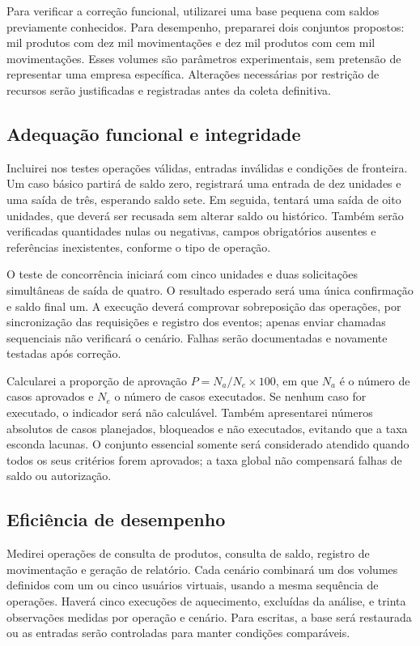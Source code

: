 Para verificar a correção funcional, utilizarei uma base pequena com saldos previamente conhecidos. Para desempenho, prepararei dois conjuntos propostos: mil produtos com dez mil movimentações e dez mil produtos com cem mil movimentações. Esses volumes são parâmetros experimentais, sem pretensão de representar uma empresa específica. Alterações necessárias por restrição de recursos serão justificadas e registradas antes da coleta definitiva.

\subsection{Adequação funcional e integridade}

Incluirei nos testes operações válidas, entradas inválidas e condições de fronteira. Um caso básico partirá de saldo zero, registrará uma entrada de dez unidades e uma saída de três, esperando saldo sete. Em seguida, tentará uma saída de oito unidades, que deverá ser recusada sem alterar saldo ou histórico. Também serão verificadas quantidades nulas ou negativas, campos obrigatórios ausentes e referências inexistentes, conforme o tipo de operação.

O teste de concorrência iniciará com cinco unidades e duas solicitações simultâneas de saída de quatro. O resultado esperado será uma única confirmação e saldo final um. A execução deverá comprovar sobreposição das operações, por sincronização das requisições e registro dos eventos; apenas enviar chamadas sequenciais não verificará o cenário. Falhas serão documentadas e novamente testadas após correção.

Calcularei a proporção de aprovação $P = N_a/N_e \times 100$, em que $N_a$ é o número de casos aprovados e $N_e$ o número de casos executados. Se nenhum caso for executado, o indicador será não calculável. Também apresentarei números absolutos de casos planejados, bloqueados e não executados, evitando que a taxa esconda lacunas. O conjunto essencial somente será considerado atendido quando todos os seus critérios forem aprovados; a taxa global não compensará falhas de saldo ou autorização.

\subsection{Eficiência de desempenho}

Medirei operações de consulta de produtos, consulta de saldo, registro de movimentação e geração de relatório. Cada cenário combinará um dos volumes definidos com um ou cinco usuários virtuais, usando a mesma sequência de operações. Haverá cinco execuções de aquecimento, excluídas da análise, e trinta observações medidas por operação e cenário. Para escritas, a base será restaurada ou as entradas serão controladas para manter condições comparáveis.

